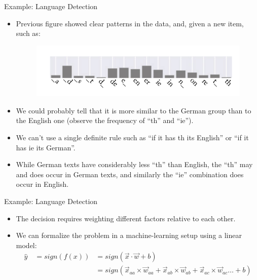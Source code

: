 \documentclass[handout]{beamer}
\begin{document}
\begin{frame}{Example: Language Detection}
\begin{scriptsize}
\begin{itemize}
\item Previous figure showed clear patterns in the data, and, given a new item, such as:

\begin{figure}[htb]
	\centering
	 \includegraphics[scale=0.4]{pics/langbigramstest.png}
\end{figure}

\item We could probably tell that it is more similar to the German group than to the English one (observe the frequency of ``th'' and ``ie'').

\item We can't use a single definite rule such as ``if it has th its English'' or ``if it has ie its German''.
\item While German texts have considerably less ``th'' than English, the ``th'' may and does occur in German texts, and similarly the ``ie'' combination does occur in English.


\end{itemize}


\end{scriptsize}
\end{frame}



\begin{frame}{Example: Language Detection}
\begin{scriptsize}
\begin{itemize}
\item The decision requires weighting different factors relative to each other.
\item We can formalize the problem in a machine-learning setup using a linear model:
\begin{equation}
\begin{split}
\hat{y} \quad = sign(f(x)) & = sign(\vec{x}\cdot \vec{w} + b) \\ 
& = sign(\vec{x}_{aa}\times \vec{w}_{aa}+ \vec{x}_{ab}\times \vec{w}_{ab}+ \vec{x}_{ac}\times \vec{w}_{ac} \dots +b)
\end{split}
\end{equation}



\end{itemize}


\end{scriptsize}
\end{frame}
\end{document}
